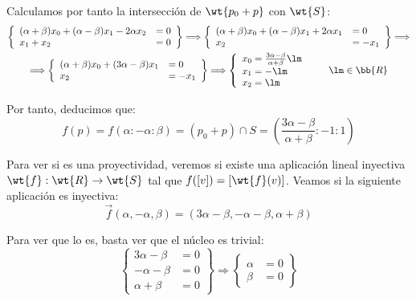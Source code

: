 \begin{ejercicio}
    Calculamos por tanto la intersección de $\wt{p_0+p}$ con $\wt{S}$:
    \begin{multline*}
        \left\{
            \begin{array}{ll}
                (\alpha+\beta)x_0 + (\alpha-\beta)x_1 -2 \alpha x_2 &= 0 \\
                x_1+x_2 &= 0
            \end{array}
        \right\}
        \Longrightarrow
        \left\{
            \begin{array}{ll}
                (\alpha+\beta)x_0 + (\alpha-\beta)x_1 +2 \alpha x_1 &= 0 \\
                x_2 &= -x_1
            \end{array}
        \right\}
        \Longrightarrow \\ \Longrightarrow
        \left\{
            \begin{array}{ll}
                (\alpha+\beta)x_0 + (3\alpha-\beta)x_1&= 0 \\
                x_2 &= -x_1
            \end{array}
        \right\}
        \Longrightarrow
        \left\{
            \begin{array}{ll}
                x_0 = \frac{3\alpha-\beta}{\alpha+\beta} \lm \\
                x_1 = -\lm \\
                x_2 = \lm
            \end{array} 
        \right. \qquad \lm \in \bb{R}
    \end{multline*}

    Por tanto, deducimos que:
    \begin{equation*}
        f(p) = f(\alpha:-\alpha:\beta)
        = (p_0+p)\cap S = \left( \frac{3\alpha-\beta}{\alpha+\beta} : -1 : 1 \right)
    \end{equation*}

    Para ver si es una proyectividad, veremos si existe una aplicación lineal
    inyectiva $\wt{f}:\wt{R}\to \wt{S}$ tal que $f([v]) = \left[\wt{f}(v)\right]$.
    Veamos si la siguiente aplicación es inyectiva:
    \begin{equation*}
        \vec{f}(\alpha, -\alpha, \beta) = \left( 3\alpha-\beta, -\alpha-\beta, {\alpha+\beta} \right)
    \end{equation*}

    Para ver que lo es, basta ver que el núcleo es trivial:
    \begin{equation*}
        \left\{
            \begin{array}{ll}
                3\alpha-\beta &= 0 \\
                -\alpha-\beta &= 0 \\
                \alpha+\beta &= 0
            \end{array}
        \right\}
        \Longrightarrow
        \left\{
            \begin{array}{ll}
                \alpha &= 0 \\
                \beta &= 0
            \end{array}
        \right\}
    \end{equation*}


\end{ejercicio}
